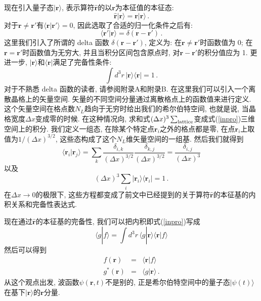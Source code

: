 \documentclass[b5paper]{book}
\begin{document}
现在引入量子态$|\mathbf{r}\rangle$, 表示算符$\hat{\mathbf{r}}$的以$\mathbf{r}$为本征值的本征态:
\begin{equation}
\hat{\mathbf{r}}|\mathbf{r}\rangle = \mathbf{r}|\mathbf{r}\rangle\,.
\end{equation}
对于$\mathbf{r}\neq \mathbf{r'}$有$\langle \mathbf{r}|\mathbf{r'}\rangle =0$, 因此选取了合适的归一化条件之后有:
\begin{equation}
\langle\mathbf{r'}|\mathbf{r}\rangle =\delta (\mathbf{r}-\mathbf{r'})\,.
\end{equation}
这里我们引入了所谓的 delta 函数 $\delta(\mathbf{r}-\mathbf{r'}) $, 定义为: 在$\mathbf{r}\neq\mathbf{r'}$时函数值为 0; 在$\mathbf{r}=\mathbf{r'}$时函数值为无穷大, 并且当积分区间包含原点时, 对$\mathbf{r}-\mathbf{r'}$的积分值应为 1. 更进一步, $|\mathbf{r}\rangle$和$\langle \mathbf{r}|$满足了完备性条件:
\begin{equation}
\int d^3r\, |\mathbf{r}\rangle \langle \mathbf{r}|=1\,.
\end{equation}
对于不熟悉 delta 函数的读者, 请参阅附录A和附录B. 在这里我们可以引入一个离散晶格上的矢量空间. 矢量的不同空间分量通过离散格点上的函数值来进行定义. 这个矢量空间在格点数$N_L$趋向于无穷时给出我们的希尔伯特空间, 也就是说, 当晶格宽度$\Delta x$变成零的时候. 在这种情况向, 求和式$(\Delta x)^3\sum_{\rm lattice}$变成式(\ref{inpro})三维空间上的积分. 我们定义一组态, 在除某个特定点$\mathbf{r}_i$之外的格点都是零, 在点$\mathbf{r}_i$上取值为$1/(\Delta x)^{3/2}$, 这些态构成了这个$N_L$维矢量空间的一组基. 然后我们就得到
\begin{equation}
\langle \mathbf{r}_i|\mathbf{r}_j\rangle=\sum_{k}\frac{\delta_{i,k}}{(\Delta x)^{3/2}}\frac{\delta_{k,j}}{(\Delta x)^{3/2}}=\frac{\delta_{i,j}}{(\Delta x)^3}
\end{equation}
以及
\begin{equation}
(\Delta x)^3\sum_i |\mathbf{r}_i\rangle\langle \mathbf{r}_i|=1\,.
\end{equation}
在$\Delta x \rightarrow 0$的极限下, 这些方程都变成了前文中已经提到的关于算符$\hat{\mathbf{r}}$的本征基的内积关系和完备性表达式. 

现在通过$\hat{\mathbf{r}}$的本征基的完备性, 我们可以把内积即式(\ref{inpro})写成
\begin{equation}
\langle g|f\rangle =\int d^3r\, \langle g|\mathbf{r}\rangle \langle \mathbf{r}|f\rangle 
\end{equation}
然后可以得到
\begin{eqnarray}
f(\mathbf{r})&=&\langle \mathbf{r}|f\rangle\nonumber\\
g^*(\mathbf{r})&=&\langle g |\mathbf{r}\rangle\,.
\end{eqnarray}
从这个观点出发, 波函数$\psi(\mathbf{r},t)$不是别的, 正是希尔伯特空间中的量子态$|\psi(t)\rangle$在基下$|\mathbf{r}\rangle$的$\mathbf{r}$分量.
\end{document}
